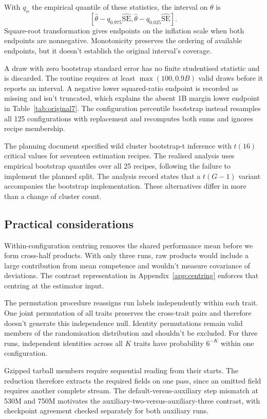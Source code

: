 With $q_\alpha$ the empirical quantile of these statistics, the interval on $\theta$ is
\[
\left[\widehat\theta-q_{0.975}\widehat{\mathrm{SE}},
\widehat\theta-q_{0.025}\widehat{\mathrm{SE}}\right]. \]
Square-root transformation gives endpoints on the inflation scale when both endpoints are nonnegative. Monotonicity preserves the ordering of available endpoints, but it doesn't establish the original interval's coverage.

A draw with zero bootstrap standard error has no finite studentised statistic and is discarded. The routine requires at least $\max(100,0.9B)$ valid draws before it reports an interval. A negative lower squared-ratio endpoint is recorded as missing and isn't truncated, which explains the absent 1B margin lower endpoint in Table~\ref{tab:original7}. The configuration percentile bootstrap instead resamples all 125 configurations with replacement and recomputes both sums and ignores recipe membership.

The planning document specified wild cluster bootstrap-t inference with $t(16)$ critical values for seventeen estimation recipes. The realised analysis uses empirical bootstrap quantiles over all 25 recipes, following the failure to implement the planned split. The analysis record states that a $t(G-1)$ variant accompanies the bootstrap implementation. These alternatives differ in more than a change of cluster count.

\subsection{Practical considerations}
Within-configuration centring removes the shared performance mean before we form cross-half products. With only three runs, raw products would include a large contribution from mean competence and wouldn't measure covariance of deviations. The contrast representation in Appendix~\ref{app:centring} enforces that centring at the estimator input.

The permutation procedure reassigns run labels independently within each trait. One joint permutation of all traits preserves the cross-trait pairs and therefore doesn't generate this independence null. Identity permutations remain valid members of the randomisation distribution and shouldn't be excluded. For three runs, independent identities across all $K$ traits have probability $6^{-K}$ within one configuration.

Gzipped tarball members require sequential reading from their starts. The reduction therefore extracts the required fields on one pass, since an omitted field requires another complete stream. The default-versus-auxiliary step mismatch at 530M and 750M motivates the auxiliary-two-versus-auxiliary-three contrast, with checkpoint agreement checked separately for both auxiliary runs.


